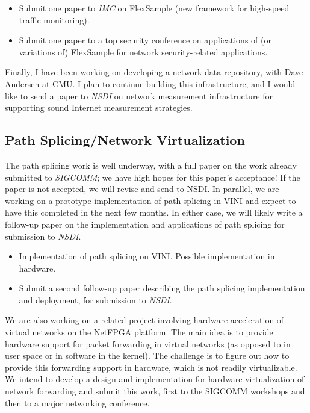 \begin{sloppypar}
\begin{itemize}
\itemsep=-1pt
\item Submit one paper to {\em IMC} on FlexSample (new
  framework for high-speed traffic monitoring).
\item Submit one paper to a top security conference on applications of
  (or variations of) FlexSample for network security-related
  applications.
\end{itemize}

\vspace*{0.1in}
\noindent
Finally, I have been working on developing a network data repository,
with Dave Andersen at CMU.  I plan to continue building this
infrastructure, and I would like to send a paper to {\em NSDI} on
network measurement infrastructure for supporting sound Internet
measurement strategies.

\subsection*{Path Splicing/Network Virtualization}

The path splicing work is well underway, with a full paper on the work
already submitted to {\em SIGCOMM}; we have high hopes for this paper's
acceptance!  If the paper is not accepted, we will revise and send to
NSDI.  In parallel, we are working on a prototype implementation of path
splicing in VINI and expect to have this completed in the next few
months.  In either case, we will likely write a follow-up paper on
the implementation and applications of path splicing for submission to
{\em NSDI}. 

\begin{itemize}
\itemsep=-1pt
\item Implementation of path splicing on VINI.  Possible implementation
  in hardware.
\item Submit a second follow-up paper describing the path splicing
  implementation and deployment, for submission to {\em NSDI}.  
\end{itemize}

We are also working on a related project involving hardware acceleration
of virtual networks on the NetFPGA platform.  The main idea is to
provide hardware support for packet forwarding in virtual networks (as
opposed to in user space or in software in the kernel).  The challenge
is to figure out how to provide this forwarding support in hardware,
which is not readily virtualizable.  We intend to develop a 
design and implementation for hardware virtualization of network
forwarding and submit this work, first to the SIGCOMM workshops and then
to a major networking conference.


\end{sloppypar}
